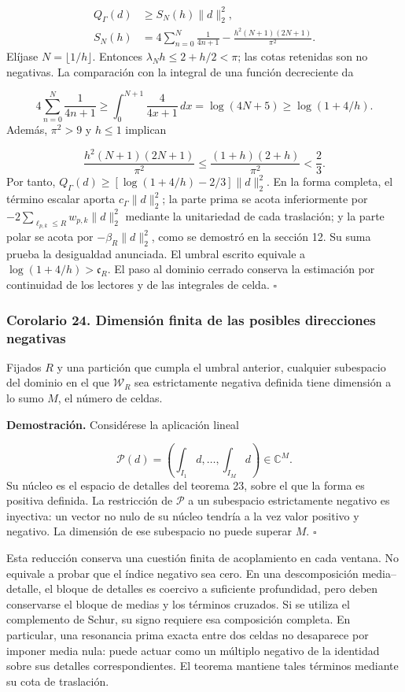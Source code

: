 \[
\begin{aligned}
Q_\Gamma(d)&\geq S_N(h)\|d\|_2^2,\\
S_N(h)&=4\sum_{n=0}^N\frac1{4n+1}
-\frac{h^2(N+1)(2N+1)}{\pi^2}.
\end{aligned}
\]
Elíjase \(N=\lfloor1/h\rfloor\). Entonces \(\lambda_N h\leq2+h/2<\pi\); las cotas retenidas son no negativas. La comparación con la integral de una función decreciente da

\[
4\sum_{n=0}^N\frac1{4n+1}
\geq\int_0^{N+1}\frac4{4x+1}\,dx
=\log(4N+5)\geq\log(1+4/h).
\]
Además, \(\pi^2>9\) y \(h\leq1\) implican

\[
\frac{h^2(N+1)(2N+1)}{\pi^2}
\leq\frac{(1+h)(2+h)}{\pi^2}<\frac23.
\]
Por tanto, \(Q_\Gamma(d)\geq[\log(1+4/h)-2/3]\|d\|_2^2\). En la forma completa, el término escalar aporta \(c_\Gamma\|d\|_2^2\); la parte prima se acota inferiormente por \(-2\sum_{\ell_{p,k}\leq R}w_{p,k}\|d\|_2^2\) mediante la unitariedad de cada traslación; y la parte polar se acota por \(-\beta_R\|d\|_2^2\), como se demostró en la sección 12. Su suma prueba la desigualdad anunciada. El umbral escrito equivale a \(\log(1+4/h)>\mathfrak c_R\). El paso al dominio cerrado conserva la estimación por continuidad de los lectores y de las integrales de celda. \hfill\(\square\)

\subsubsection*{Corolario 24. Dimensión finita de las posibles direcciones negativas}
Fijados \(R\) y una partición que cumpla el umbral anterior, cualquier subespacio del dominio en el que \(\mathscr W_R\) sea estrictamente negativa definida tiene dimensión a lo sumo \(M\), el número de celdas.

\textbf{Demostración.} Considérese la aplicación lineal

\[
\mathcal P(d)=\left(\int_{I_1}d,\ldots,
\int_{I_M}d\right)\in\mathbb C^M.
\]
Su núcleo es el espacio de detalles del teorema 23, sobre el que la forma es positiva definida. La restricción de \(\mathcal P\) a un subespacio estrictamente negativo es inyectiva: un vector no nulo de su núcleo tendría a la vez valor positivo y negativo. La dimensión de ese subespacio no puede superar \(M\). \hfill\(\square\)

Esta reducción conserva una cuestión finita de acoplamiento en cada ventana. No equivale a probar que el índice negativo sea cero. En una descomposición media–detalle, el bloque de detalles es coercivo a suficiente profundidad, pero deben conservarse el bloque de medias y los términos cruzados. Si se utiliza el complemento de Schur, su signo requiere esa composición completa. En particular, una resonancia prima exacta entre dos celdas no desaparece por imponer media nula: puede actuar como un múltiplo negativo de la identidad sobre sus detalles correspondientes. El teorema mantiene tales términos mediante su cota de traslación.

